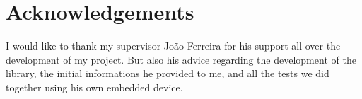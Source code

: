 \chapter*{Acknowledgements}

\hspace{15mm}I would like to thank my supervisor Jo\~{a}o Ferreira for his support all over the development of my project. But also his advice regarding the development of the library, the initial informations he provided to me, and all the tests we did together using his own embedded device.


\clearpage